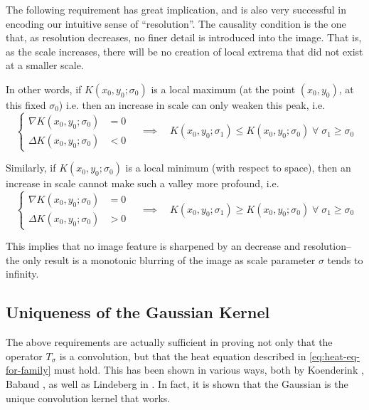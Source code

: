    \begin{axiom} \label{axiom:causality}
    The following requirement has great implication, and is also
    very successful in encoding our intuitive sense
    of ``resolution''. The causality condition is the one
    that, as resolution decreases, no finer detail is
    introduced into the image. That is, as the scale
    increases, there will be no creation of local extrema
    that did not exist at a smaller scale.
    \end{axiom}
    In other words, if 
    $K(x_0,y_0 ; \sigma_0)$ is a local maximum (at the point $(x_0, y_0)$, at this fixed $\sigma_0$)
    i.e. 
    then an increase in scale can only weaken this peak, i.e.
    \begin{equation}
    \left\{\begin{aligned}
    \nabla K(x_0,y_0; \sigma_0) &= 0 \\
    \Delta K(x_0,y_0;\sigma_0) &< 0
    \end{aligned}\right.
	\quad \implies \quad
	K(x_0,y_0;\sigma_1) \le K(x_0,y_0;\sigma_0)
	\; \forall\; \sigma_1 \ge \sigma_0
    \end{equation}
    
    Similarly, if $K(x_0,y_0;\sigma_0)$ is a local minimum (with respect to space), then an increase in scale cannot make such a valley more profound, i.e.
   \begin{equation}
   \left\{\begin{aligned}
   \nabla K(x_0,y_0; \sigma_0) &= 0 \\
	\Delta K(x_0,y_0;\sigma_0) &> 0
	\end{aligned}\right.
	\quad \implies \quad
	K(x_0,y_0;\sigma_1) \ge K(x_0,y_0;\sigma_0)
	\; \forall\; \sigma_1 \ge \sigma_0
	\end{equation}
    
    This implies that no image feature is sharpened by an decrease and resolution--the only result is a monotonic blurring of the image as scale parameter $\sigma$ tends to infinity.


    \subsection{Uniqueness of the Gaussian Kernel}
    
    The above requirements are actually sufficient in proving not only that the operator $T_\sigma$ is a convolution, but that the heat equation described in \cref{eq:heat-eq-for-family} must hold. This has been shown in various ways, both by Koenderink \cite{Koenderink}, Babaud \cite{babaud}, as well as Lindeberg in \cite{GSST-book}. In fact, it is shown that the Gaussian is the unique convolution kernel that works.    
    
